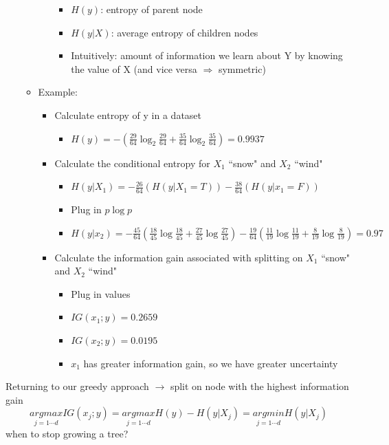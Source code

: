 \documentclass[10pt, oneside]{article}
\begin{document}
\begin{itemize}
\begin{itemize}
\begin{itemize}
\begin{itemize}
                \item $H(y)$: entropy of parent node
                \item $H(y|X)$: average entropy of children nodes
                \item Intuitively: amount of information we learn about Y by knowing the value of X (and vice versa $\Rightarrow$ symmetric)
            \end{itemize}
        \end{itemize}
        \item Example:
            \begin{itemize}
                \item Calculate entropy of y in a dataset
                \begin{itemize}
                    \item $H(y) = -(\frac{29}{64}\log_2 \frac{29}{64} + \frac{35}{64}\log_2 \frac{35}{64}) = 0.9937$
                \end{itemize}
                \item Calculate the conditional entropy for $X_1$ ``snow" and $X_2$ ``wind"
                \begin{itemize}
                    \item $H(y|X_1) = - \frac{26}{64} (H(y|X_1 = T)) - \frac{38}{64}( H(y|x_1 = F))$
                    \item Plug in $p\log p$
                    \item $H(y|x_2) = -\frac{45}{64}(\frac{18}{45} \log \frac{18}{45} + \frac{27}{45}\log \frac{27}{45}) - \frac{19}{64}(\frac{11}{19} \log \frac{11}{19} + \frac{8}{19}\log \frac{8}{19}) = 0.97$
                \end{itemize}
                \item Calculate the information gain associated with splitting on $X_1$ ``snow" and $X_2$ ``wind"
                \begin{itemize}
                    \item Plug in values
                    \item $IG(x_1;y) = 0.2659$
                    \item $IG(x_2; y) = 0.0195$
                    \item $x_1$ has greater information gain, so we have greater uncertainty
                \end{itemize}
        \end{itemize}
    \end{itemize}
\end{itemize}
Returning to our greedy approach $\rightarrow$ split on node with the highest information gain
\[\underset{j=1\cdots d}{argmax} IG(x_j; y) = \underset{j=1\cdots d}{argmax} H(y) - H(y|X_j) = \underset{j=1\cdots d}{argmin} H(y|X_j)\]
when to stop growing a tree?


\end{document}
